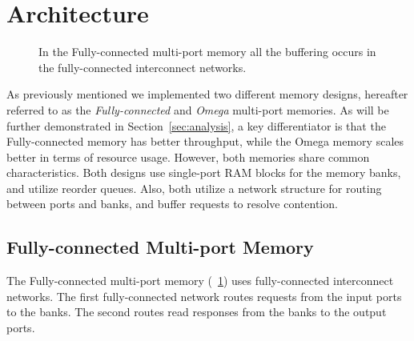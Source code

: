\section{Architecture}
\label{sec:architecture}
    \begin{figure}
        \center
        \caption{In the Fully-connected multi-port memory all the buffering occurs in the fully-connected interconnect networks.}
        \label{fig:fullmemory}
    \end{figure}


As previously mentioned we implemented two different memory designs, hereafter referred to as the {\it Fully-connected} and {\it Omega} multi-port memories. As will be further demonstrated in Section~\ref{sec:analysis}, a key differentiator is that the Fully-connected memory has better throughput, while the Omega memory scales better in terms of resource usage. However, both memories share common characteristics. Both designs use single-port RAM blocks for the memory banks, and utilize reorder queues. Also, both utilize a network structure for routing between ports and banks, and buffer requests to resolve contention. 

\subsection{Fully-connected Multi-port Memory}
    The Fully-connected multi-port memory (\figurename~\ref{fig:fullmemory}) uses fully-connected interconnect networks. The first fully-connected network routes requests from the input ports to the banks. The second routes read responses from the banks to the output ports.
